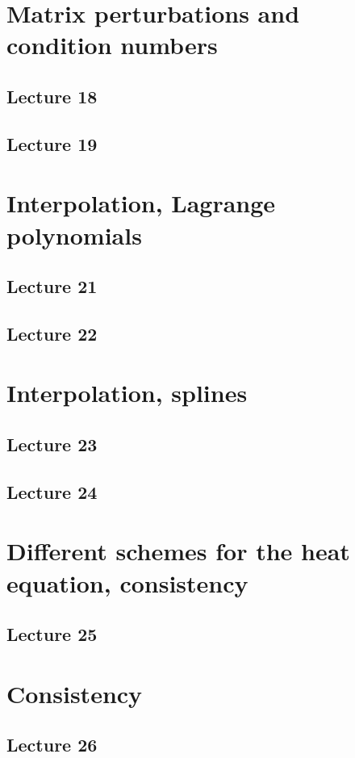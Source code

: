 \documentclass{article}
\begin{document}
\section{Matrix perturbations and condition numbers}
\subsection{Lecture 18}
\subsection{Lecture 19}


\section{Interpolation, Lagrange polynomials}
\subsection{Lecture 21}
\subsection{Lecture 22}


\section{Interpolation, splines}
\subsection{Lecture 23}
\subsection{Lecture 24}


\section{Different schemes for the heat equation, consistency}
\subsection{Lecture 25}


\section{Consistency}
\subsection{Lecture 26}
\end{document}
